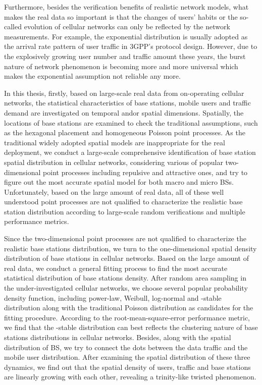 Furthermore, besides the verification benefits of realistic network models, what makes the real data so important is that the changes of users' habits or the so-called evolution of cellular networks can only be reflected by the network measurements. For example, the exponential distribution is usually adopted as the arrival rate pattern of user traffic in 3GPP's protocol design. However, due to the explosively growing user number and traffic amount these years, the burst nature of network phenomenon is becoming more and more universal which makes the exponential assumption not reliable any more.

In this thesis, firstly, based on large-scale real data from on-operating cellular networks, the statistical characteristics of base stations, mobile users and traffic demand are investigated on temporal and\/or spatial dimensions. Spatially, the locations of base stations are examined to check the traditional assumptions, such as the hexagonal placement and homogeneous Poisson point processes. As the traditional widely adopted spatial models are inappropriate for the real deployment, we conduct a large-scale comprehensive identification of base station spatial distribution in cellular networks, considering various of popular two-dimensional point processes including repulsive and attractive ones, and try to figure out the most accurate spatial model for both macro and micro BSs. Unfortunately, based on the large amount of real data, all of these well understood point processes are not qualified to characterize the realistic base station distribution according to large-scale random verifications and multiple performance metrics.

Since the two-dimensional point processes are not qualified to characterize the realistic base stations distribution, we turn to the one-dimensional spatial density distribution of base stations in cellular networks. Based on the large amount of real data, we conduct a general fitting process to find the most accurate statistical distribution of base stations density. After random area sampling in the under-investigated cellular networks, we choose several popular probability density function, including power-law, Weibull, log-normal and \alpha-stable distribution along with the traditional Poisson distribution as candidates for the fitting procedure. According to the root-mean-square-error performance metric, we find that the \alpha-stable distribution can best reflects the clustering nature of base stations distributions in cellular networks. Besides, along with the spatial distribution of BS, we try to connect the dots between the data traffic and the mobile user distribution. After examining the spatial distribution of these three dynamics, we find out that the spatial density of users, traffic and base stations are linearly growing with each other, revealing a trinity-like twisted phenomenon.

